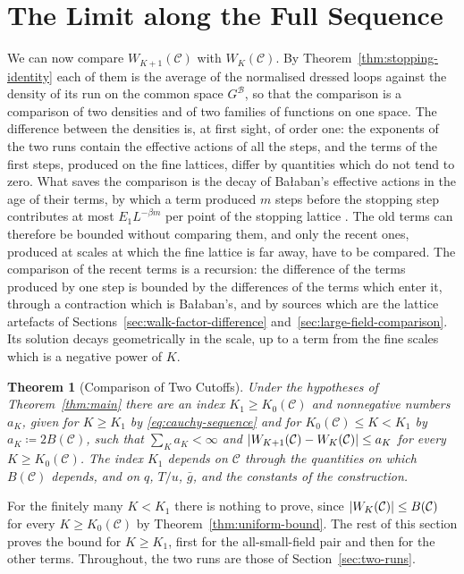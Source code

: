 \documentclass[11pt]{preprint}
\DeclarePairedDelimiter{\abs}{\lvert}{\rvert}
\numberwithin{equation}{section}
\newtheorem{theorem}{Theorem}[section]
\theoremstyle{definition}
\theoremstyle{remark}
\theoremstyle{plain}
\begin{document}
\section{The Limit along the Full Sequence}\label{sec:cauchy}

We can now compare $W_{K+1}(\mathcal C)$ with $W_K(\mathcal C)$. By Theorem~\ref{thm:stopping-identity} each of them is the average of the normalised dressed loops against the density of its run on the common space $G^{\mathcal B}$, so that the comparison is a comparison of two densities and of two families of functions on one space. The difference between the densities is, at first sight, of order one: the exponents of the two runs contain the effective actions of all the steps, and the terms of the first steps, produced on the fine lattices, differ by quantities which do not tend to zero. What saves the comparison is the decay of Ba{\l}aban's effective actions in the age of their terms, by which a term produced $m$ steps before the stopping step contributes at most $E_1L^{-\beta m}$ per point of the stopping lattice \cite[(2.43), p.~263]{BalabanCRE}. The old terms can therefore be bounded without comparing them, and only the recent ones, produced at scales at which the fine lattice is far away, have to be compared. The comparison of the recent terms is a recursion: the difference of the terms produced by one step is bounded by the differences of the terms which enter it, through a contraction which is Ba{\l}aban's, and by sources which are the lattice artefacts of Sections~\ref{sec:walk-factor-difference} and~\ref{sec:large-field-comparison}. Its solution decays geometrically in the scale, up to a term from the fine scales which is a negative power of $K$.

\begin{theorem}[Comparison of Two Cutoffs]\label{thm:cauchy}
Under the hypotheses of Theorem~\ref{thm:main} there are an index $K_1 \geq K_0(\mathcal C)$ and nonnegative numbers $a_K$, given for $K \geq K_1$ by \eqref{eq:cauchy-sequence} and for $K_0(\mathcal C) \leq K < K_1$ by $a_K \coloneqq 2B(\mathcal C)$, such that $\sum_Ka_K < \infty$ and $\abs{W_{K+1}(\mathcal C) - W_K(\mathcal C)} \leq a_K$ for every $K \geq K_0(\mathcal C)$. The index $K_1$ depends on $\mathcal C$ through the quantities on which $B(\mathcal C)$ depends, and on $q$, $T/u$, $\bar g$, and the constants of the construction.
\end{theorem}

For the finitely many $K < K_1$ there is nothing to prove, since $\abs{W_K(\mathcal C)} \leq B(\mathcal C)$ for every $K \geq K_0(\mathcal C)$ by Theorem~\ref{thm:uniform-bound}. The rest of this section proves the bound for $K \geq K_1$, first for the all-small-field pair and then for the other terms. Throughout, the two runs are those of Section~\ref{sec:two-runs}.
\end{document}

